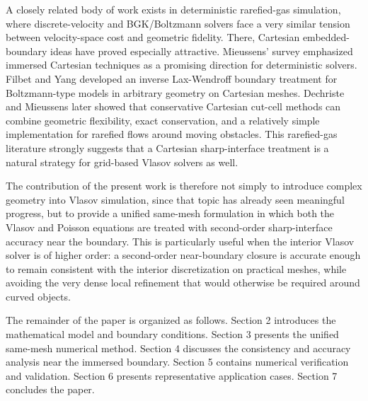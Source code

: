 A closely related body of work exists in deterministic rarefied-gas simulation, where discrete-velocity and BGK/Boltzmann solvers face a very similar tension between velocity-space cost and geometric fidelity. There, Cartesian embedded-boundary ideas have proved especially attractive. Mieussens’ survey emphasized immersed Cartesian techniques as a promising direction for deterministic solvers. Filbet and Yang developed an inverse Lax-Wendroff boundary treatment for Boltzmann-type models in arbitrary geometry on Cartesian meshes. Dechriste and Mieussens later showed that conservative Cartesian cut-cell methods can combine geometric flexibility, exact conservation, and a relatively simple implementation for rarefied flows around moving obstacles. This rarefied-gas literature strongly suggests that a Cartesian sharp-interface treatment is a natural strategy for grid-based Vlasov solvers as well.

The contribution of the present work is therefore not simply to introduce complex geometry into Vlasov simulation, since that topic has already seen meaningful progress, but to provide a unified same-mesh formulation in which both the Vlasov and Poisson equations are treated with second-order sharp-interface accuracy near the boundary. This is particularly useful when the interior Vlasov solver is of higher order: a second-order near-boundary closure is accurate enough to remain consistent with the interior discretization on practical meshes, while avoiding the very dense local refinement that would otherwise be required around curved objects. 

The remainder of the paper is organized as follows. Section 2 introduces the mathematical model and boundary conditions. Section 3 presents the unified same-mesh numerical method. Section 4 discusses the consistency and accuracy analysis near the immersed boundary. Section 5 contains numerical verification and validation. Section 6 presents representative application cases. Section 7 concludes the paper.
